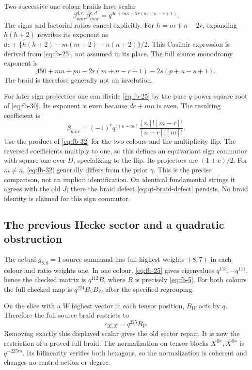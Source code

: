 Two successive one-colour braids have scalar
\begin{equation}\tag{FB30}\label{eq:fb-30}
\beta_{mnr}^{d,e}\beta_{nmr}^{e,d}
 =q^{de+mn-2r(m+n-r+1)}.
\end{equation}
The signs and factorial ratios cancel explicitly. For
\(h=m+n-2r\), expanding \(h(h+2)\) rewrites its exponent as
\(de+\{h(h+2)-m(m+2)-n(n+2)\}/2\).
This Casimir expression is derived from \eqref{eq:fb-25}, not assumed in its place.
The full source monodromy exponent is
\begin{equation}\tag{FB31}\label{eq:fb-31}
450+mn+pu-2r(m+n-r+1)-2s(p+u-s+1).
\end{equation}
The braid is therefore generally not an involution.

For later sign projectors one can divide \eqref{eq:fb-25} by the pure \(q\)-power
square root of \eqref{eq:fb-30}. Its exponent is even because \(de+mn\) is even.
The resulting coefficient is
\begin{equation}\tag{FB32}\label{eq:fb-32}
\overline\beta_{mnr}=(-1)^r q^{r(n-m)}
 \frac{[n]![m-r]!}{[n-r]![m]!}.
\end{equation}
Use the product of \eqref{eq:fb-32} for the two colours and the multiplicity flip.
The reversed coefficients multiply to one, so this defines an
equivariant sign commutor with square one over \(D\), specializing to
the flip. Its projectors are \((1\pm\overline c)/2\).
For \(m\ne n\), \eqref{eq:fb-32} generally differs from the prior \(\gamma\).
This is the precise comparison, not an implicit identification.
On identical fundamental strings it agrees with the old \(J\);
there the braid defect \eqref{eq:qt-braid-defect} persists. No braid identity is
claimed for this sign commutor.

\subsection{The previous Hecke sector and a quadratic obstruction}
\label{sec:fb-hecke}

The actual \(g_{8,8}=1\) source summand has full highest weights
\((8,7)\) in each colour and ratio weights one. In one colour,
\eqref{eq:fb-25} gives eigenvalues \(q^{113},-q^{111}\), hence the checked
matrix is \(q^{112}B\), where \(B\) is precisely \eqref{eq:fb-5}.
For both colours the full checked map is \(q^{224}B_VB_W\) after
the specified regrouping.

On the slice with a \(W\) highest vector in each tensor position,
\(B_W\) acts by \(q\). Therefore the full source braid restricts to
\begin{equation}\tag{FB33}\label{eq:fb-33}
c_{X,X}=q^{225}B_V.
\end{equation}
Removing exactly this displayed scalar gives the old sector repair.
It is now the restriction of a proved full braid. The normalization
on tensor blocks \(X^{\otimes r},X^{\otimes s}\) is \(q^{-225rs}\).
Its bilinearity verifies both hexagons, so the normalization is
coherent and changes no central action or degree.

